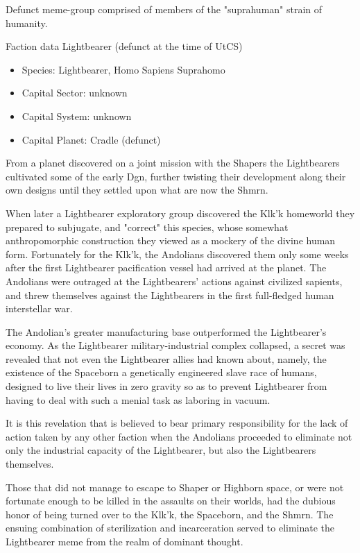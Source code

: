 Defunct meme-group comprised of members of the "suprahuman" strain of humanity.

Faction data Lightbearer (defunct at the time of UtCS)
\begin{itemize}
\item Species: Lightbearer, Homo Sapiens Suprahomo
\item Capital Sector: unknown
\item Capital System: unknown
\item Capital Planet: Cradle (defunct)
\end{itemize}

From a planet discovered on a joint mission with the Shapers the
Lightbearers cultivated some of the early Dgn, further twisting their
development along their own designs until they settled upon what are
now the Shmrn.

When later a Lightbearer exploratory group discovered the Klk'k
homeworld they prepared to subjugate, and "correct" this species,
whose somewhat anthropomorphic construction they viewed as a mockery
of the divine human form. Fortunately for the Klk'k, the Andolians
discovered them only some weeks after the first Lightbearer
pacification vessel had arrived at the planet. The Andolians were
outraged at the Lightbearers' actions against civilized sapients, and
threw themselves against the Lightbearers in the first full-fledged
human interstellar war.

The Andolian's greater manufacturing base outperformed the
Lightbearer's economy. As the Lightbearer military-industrial complex
collapsed, a secret was revealed that not even the Lightbearer allies
had known about, namely, the existence of the Spaceborn a genetically
engineered slave race of humans, designed to live their lives in zero
gravity so as to prevent Lightbearer from having to deal with such a
menial task as laboring in vacuum.

It is this revelation that is believed to bear primary responsibility
for the lack of action taken by any other faction when the Andolians
proceeded to eliminate not only the industrial capacity of the
Lightbearer, but also the Lightbearers themselves.

Those that did not manage to escape to Shaper or Highborn space, or
were not fortunate enough to be killed in the assaults on their
worlds, had the dubious honor of being turned over to the Klk'k, the
Spaceborn, and the Shmrn. The ensuing combination of sterilization and
incarceration served to eliminate the Lightbearer meme from the realm
of dominant thought.
